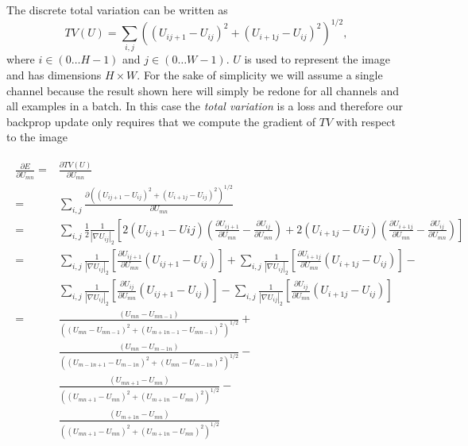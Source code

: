 \documentclass[a4paper]{article}
\begin{document}
The discrete total variation can be written as 
\begin{equation}
TV(U)= \sum_{i,j} \left ( \left ( U_{ij+1}-U_{ij}\right )^2 + \left ( U_{i+1j}-U_{ij}\right )^2 \right )^{1/2},
\end{equation}
where $i \in (0\dots H-1)$ and $j \in (0\dots W-1)$. $U$ is used to represent the image and has dimensions $H \times W$. For the sake of simplicity we will assume a single channel because the result shown here will simply be redone for all channels and all examples in a batch. In this case the {\it total variation} is a loss and therefore our backprop update only requires that we compute the gradient of $TV$ with respect to the image

\begin{align}
\begin{split}
\frac{\partial{E}}{\partial{U_{mn}}} = & \frac{\partial{TV(U)}}{\partial{U_{mn}}} \\
 = & \sum_{i,j} \frac{\partial \left ( \left ( U_{ij+1}-U_{ij}\right )^2 + \left ( U_{i+1j}-U_{ij}\right )^2 \right )^{1/2}}{\partial U_{mn}}\\
  = & \sum_{i,j} \frac{1}{2}\frac{1}{ \left | \nabla U_{ij} \right |_2}\left [ 2(U_{ij+1}-U{ij})(\frac{\partial U_{ij+1}}{\partial U_{mn}} - \frac{\partial U_{ij}}{\partial U_{mn}}) + 2(U_{i+1j}-U{ij})(\frac{\partial U_{i+1j}}{\partial U_{mn}} - \frac{\partial U_{ij}}{\partial U_{mn}}) \right ] \\
  = & 
  \sum_{i,j}  \frac{1}{ \left | \nabla U_{ij} \right |_2}
  \left [ \frac{\partial U_{ij+1}}{\partial U_{mn}}\left ( U_{ij+1}-U_{ij} \right )\right] + 
  \sum_{i,j}  \frac{1}{ \left | \nabla U_{ij} \right |_2} 
  \left [\frac{\partial U_{i+1j}}{\partial U_{mn}} \left (U_{i+1j}-U_{ij} \right ) \right] -\\
   & \sum_{i,j}  \frac{1}{ \left | \nabla U_{ij} \right |_2}
   \left [ \frac{\partial U_{ij}}{\partial U_{mn}} \left ( U_{ij+1}-U_{ij}\right ) \right] - 
   \sum_{i,j}  \frac{1}{ \left | \nabla U_{ij} \right |_2}
   \left [ \frac{\partial U_{ij}}{\partial U_{mn}} \left ( U_{i+1j}-U_{ij}\right ) \right]\\
  = & \frac{\left (U_{mn}-U_{mn-1} \right )}{ \left (\left ( U_{mn}-U_{mn-1}\right )^2 + \left ( U_{m+1n-1}-U_{mn-1}\right )^2 \right )^{1/2}} + \\
    & \frac{\left (U_{mn}-U_{m-1n} \right )}{ \left (\left ( U_{m-1n+1}-U_{m-1n}\right )^2 + \left ( U_{mn}-U_{m-1n}\right )^2 \right )^{1/2}} -\\
    & \frac{\left (U_{mn+1}-U_{mn} \right )}{ \left (\left ( U_{mn+1}-U_{mn}\right )^2 + \left ( U_{m+1n}-U_{mn}\right )^2 \right )^{1/2}} -\\
    & \frac{\left (U_{m+1n}-U_{mn} \right )}{ \left (\left ( U_{mn+1}-U_{mn}\right )^2 + \left ( U_{m+1n}-U_{mn}\right )^2 \right )^{1/2}} \\
\end{split}
\end{align}
\end{document}
